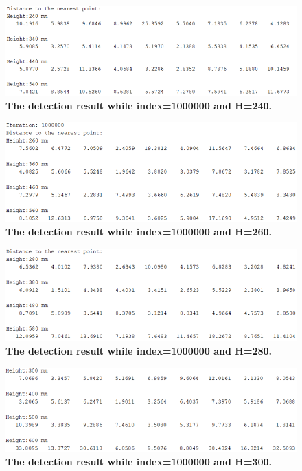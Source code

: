 \begin{figure}[H] %
    \centering %
    \captionsetup{labelsep=colon}
    \includegraphics[width=0.65\linewidth]{Image/Code-Display/matlab_240.png}
    \caption[The detection result while index=1000000 and H=240]
    {\centering \textbf{The detection result while index=1000000 and H=240.}}
    \label{fig:matlab_240}
\end{figure}
\begin{figure}[H] %
    \centering %
    \captionsetup{labelsep=colon}
    \includegraphics[width=0.65\linewidth]{Image/Code-Display/matlab_260.png}
    \caption[The detection result while index=1000000 and H=260]
    {\centering \textbf{The detection result while index=1000000 and H=260.}}
    \label{fig:matlab_260}
\end{figure}
\begin{figure}[H] %
    \centering %
    \captionsetup{labelsep=colon}
    \includegraphics[width=0.65\linewidth]{Image/Code-Display/matlab_280.png}
    \caption[The detection result while index=1000000 and H=280]
    {\centering \textbf{The detection result while index=1000000 and H=280.}}
    \label{fig:matlab_280}
\end{figure}
\begin{figure}[H] %
    \centering %
    \captionsetup{labelsep=colon}
    \includegraphics[width=0.65\linewidth]{Image/Code-Display/matlab_300.png}
    \caption[The detection result while index=1000000 and H=300]
    {\centering \textbf{The detection result while index=1000000 and H=300.}}
    \label{fig:matlab_300}
\end{figure}

\newpage